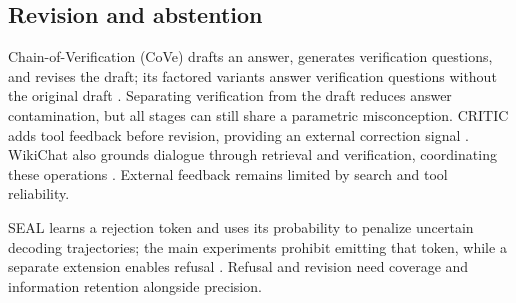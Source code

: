 \subsection{Revision and abstention}

Chain-of-Verification (CoVe) drafts an answer, generates verification questions, and revises the draft; its factored variants answer verification questions without the original draft \citep{dhuliawala-etal-2024-chain}. Separating verification from the draft reduces answer contamination, but all stages can still share a parametric misconception. CRITIC adds tool feedback before revision, providing an external correction signal \citep{extcritic2024}. WikiChat also grounds dialogue through retrieval and verification, coordinating these operations \citep{semnani-etal-2023-wikichat}. External feedback remains limited by search and tool reliability.

SEAL learns a rejection token and uses its probability to penalize uncertain decoding trajectories; the main experiments prohibit emitting that token, while a separate extension enables refusal \citep{huang-etal-2025-alleviating}. Refusal and revision need coverage and information retention alongside precision.
